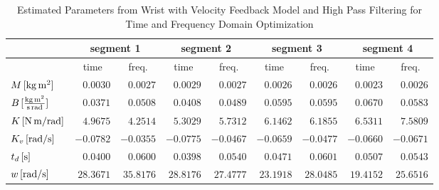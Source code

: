 \documentclass[11pt,a4paper]{article}
\begin{document}
\begin{sidewaystable}
    \centering
    \begin{tabular}{|l|r|r|r|r|r|r|r|r|}
        \hline
        \nonumber &
            \multicolumn{2}{c|}{segment 1} &
            \multicolumn{2}{c|}{segment 2} &
            \multicolumn{2}{c|}{segment 3} &
            \multicolumn{2}{c|}{segment 4} \\
        \hline
        \nonumber &
            \multicolumn{1}{c|}{time} & \multicolumn{1}{c|}{freq.} &
            \multicolumn{1}{c|}{time} & \multicolumn{1}{c|}{freq.} &
            \multicolumn{1}{c|}{time} & \multicolumn{1}{c|}{freq.} &
            \multicolumn{1}{c|}{time} & \multicolumn{1}{c|}{freq.} \\
        \hline
        $\unit[M]{[kg\,m^2]}$ &
            $0.0030$ & $0.0027$ & $0.0029$ & $0.0027$ &
            $0.0026$ & $0.0026$ & $0.0023$ & $0.0026$ \\
        $\unit[B]{[\frac{kg\,m^2}{s\,rad}]}$ &
            $0.0371$ & $0.0508$ & $0.0408$ & $0.0489$ &
            $0.0595$ & $0.0595$ & $0.0670$ & $0.0583$ \\
        $\unit[K]{[N\,m/rad]}$ &
            $4.9675$ & $4.2514$ & $5.3029$ & $5.7312$ &
            $6.1462$ & $6.1855$ & $6.5311$ & $7.5809$ \\
        $\unit[K_v]{[rad/s]}$ &
            $-0.0782$ & $-0.0355$ & $-0.0775$ & $-0.0467$ &
            $-0.0659$ & $-0.0477$ & $-0.0660$ & $-0.0671$ \\
        $\unit[t_d]{[s]}$ &
            $0.0400$ & $0.0600$ & $0.0398$ & $0.0540$ &
            $0.0471$ & $0.0601$ & $0.0507$ & $0.0543$ \\
        $\unit[w]{[rad/s]}$ &
            $28.3671$ & $35.8176$ & $28.8176$ & $27.4777$ &
            $23.1918$ & $28.0485$ & $19.4152$ & $25.6516$ \\
        \hline
    \end{tabular}
    \caption{Estimated Parameters from Wrist with Velocity Feedback Model and
        High Pass Filtering for Time and Frequency Domain Optimization}
    \label{tab:segparamhp}
\end{sidewaystable}
\end{document}
